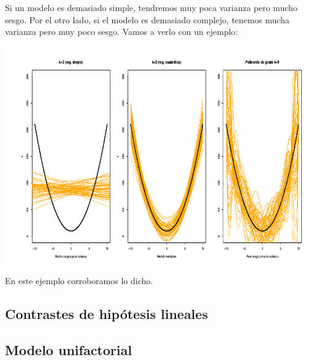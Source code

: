 \begin{example}

Si un modelo es demasiado simple, tendremos muy poca varianza pero mucho sesgo. Por el otro lado, si el modelo es demasiado complejo, tenemos mucha varianza pero muy poco sesgo. Vamos a verlo con un ejemplo:

\begin{center}
\includegraphics[scale=0.45]{img/ModeloSimpleVsModeloComplejo.png}
\end{center}

En este ejemplo corroboramos lo dicho.
	
\end{example}

\subsection{Contrastes de hipótesis lineales}
\subsection{Modelo unifactorial}
